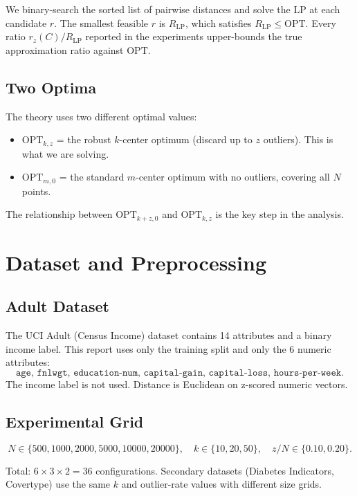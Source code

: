 \documentclass[11pt]{article}
\begin{document}
We binary-search the sorted list of pairwise distances and solve the LP at each candidate $r$. The smallest feasible $r$ is $R_\mathrm{LP}$, which satisfies $R_\mathrm{LP} \le \mathrm{OPT}$. Every ratio $r_z(C)/R_\mathrm{LP}$ reported in the experiments upper-bounds the true approximation ratio against $\mathrm{OPT}$.

\subsection{Two Optima}

The theory uses two different optimal values:
\begin{itemize}
    \item $\mathrm{OPT}_{k,z}$ = the robust $k$-center optimum (discard up to $z$ outliers). This is what we are solving.
    \item $\mathrm{OPT}_{m,0}$ = the standard $m$-center optimum with no outliers, covering all $N$ points.
\end{itemize}

The relationship between $\mathrm{OPT}_{k+z,0}$ and $\mathrm{OPT}_{k,z}$ is the key step in the analysis.


\section{Dataset and Preprocessing}

\subsection{Adult Dataset}

The UCI Adult (Census Income) dataset contains 14 attributes and a binary income label. This report uses only the training split and only the 6 numeric attributes:
\[
\texttt{age, fnlwgt, education-num, capital-gain, capital-loss, hours-per-week}.
\]
The income label is not used. Distance is Euclidean on z-scored numeric vectors.

\subsection{Experimental Grid}

\[
N \in \{500, 1000, 2000, 5000, 10000, 20000\},\quad
k \in \{10, 20, 50\},\quad
z/N \in \{0.10, 0.20\}.
\]

Total: $6 \times 3 \times 2 = 36$ configurations. Secondary datasets (Diabetes Indicators, Covertype) use the same $k$ and outlier-rate values with different size grids.
\end{document}
